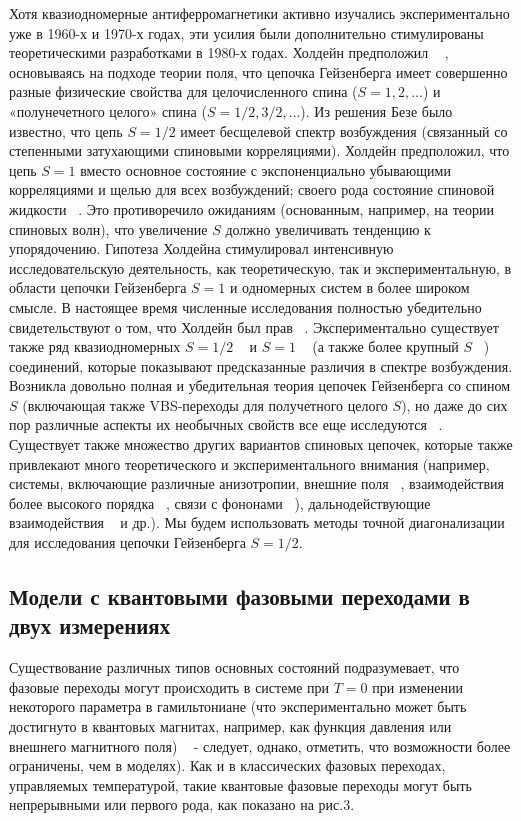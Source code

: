 \documentclass[11pt]{article}
\begin{document}
Хотя квазиодномерные антиферромагнетики активно изучались экспериментально уже в 1960-х и 1970-х годах, эти усилия были дополнительно стимулированы теоретическими разработками в 1980-х годах. Холдейн предположил ~\cite{prl_50_1153} , основываясь на подходе теории поля, что цепочка Гейзенберга имеет совершенно разные физические свойства для целочисленного спина ($S = 1, 2, \dots $) и «полунечетного целого» спина ($S = 1 / 2, 3/2, \dots $). Из решения Безе было известно, что цепь $S = 1/2$ имеет бесщелевой спектр возбуждения (связанный со степенными затухающими спиновыми корреляциями). Холдейн предположил, что цепь $S = 1$ вместо
основное состояние с экспоненциально убывающими корреляциями и щелью для всех возбуждений; своего рода состояние спиновой жидкости ~\cite{cmp_115_477}. Это противоречило ожиданиям (основанным, например, на теории спиновых волн), что увеличение $S$ должно увеличивать тенденцию к упорядочению. Гипотеза Холдейна
стимулировал интенсивную исследовательскую деятельность, как теоретическую, так и экспериментальную, в области цепочки Гейзенберга $S = 1$ и одномерных систем в более широком смысле. В настоящее время численные исследования полностью убедительно свидетельствуют о том, что Холдейн был прав ~\cite{prb_40_2421, prl_64_1597, prb_54_4038}. Экспериментально существует также ряд квазиодномерных $S = 1/2$ ~\cite{prl_70_4003} и $S=1$ ~\cite{prb_50_9174} (а также более крупный $S$ ~\cite{prl_77_1616}) соединений, которые показывают предсказанные различия в спектре возбуждения. Возникла довольно полная и убедительная теория цепочек Гейзенберга со спином $S$ (включающая также VBS-переходы для получетного целого $S$), но даже до сих пор различные аспекты их необычных свойств все еще исследуются ~\cite{prl_96_257202}. Существует также множество других вариантов спиновых цепочек, которые также привлекают много теоретического и экспериментального внимания (например, системы, включающие различные анизотропии, внешние поля ~\cite{prl_95_077201}, взаимодействия более высокого порядка ~\cite{prb_74_144426}, связи с фононами ~\cite{prl_83_195, arXiv_0705_0799}), дальнодействующие взаимодействия ~\cite{sm_2005_P12001, prl_104_137204} и др.). Мы будем использовать методы точной диагонализации для исследования цепочки Гейзенберга $S = 1/2$.

\subsection{Модели с квантовыми фазовыми переходами в двух измерениях}
Существование различных типов основных состояний подразумевает, что фазовые переходы могут происходить в системе при $T = 0$ при изменении некоторого параметра в гамильтониане (что экспериментально может быть достигнуто в квантовых магнитах, например, как функция давления или внешнего магнитного поля) ~\cite{prl_100_205701} - следует, однако, отметить, что возможности более ограничены, чем в моделях). Как и в классических фазовых переходах, управляемых температурой, такие квантовые фазовые переходы могут быть непрерывными или первого рода, как показано на рис.3.
\end{document}
